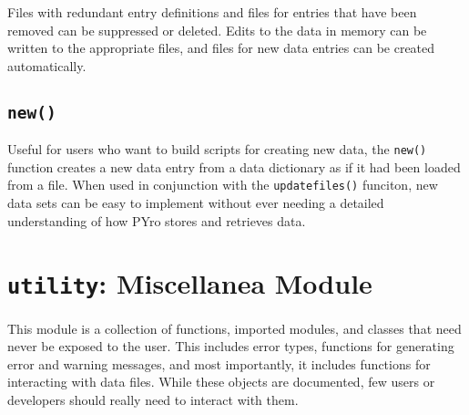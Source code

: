 Files with redundant entry definitions and files for entries that have been removed can be suppressed or deleted.  Edits to the data in memory can be written to the appropriate files, and files for new data entries can be created automatically.

\subsection{\texttt{new()}}
Useful for users who want to build scripts for creating new data, the \verb|new()| function creates a new data entry from a data dictionary as if it had been loaded from a file.  When used in conjunction with the \verb|updatefiles()| funciton, new data sets can be easy to implement without ever needing a detailed understanding of how PYro stores and retrieves data.

\section{\texttt{utility}: Miscellanea Module}
This module is a collection of functions, imported modules, and classes that need never be exposed to the user.  This includes error types, functions for generating error and warning messages, and most importantly, it includes functions for interacting with data files.  While these objects are documented, few users or developers should really need to interact with them.


